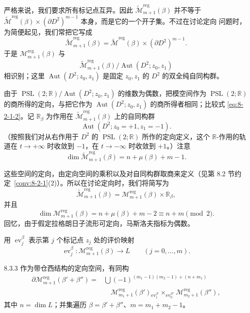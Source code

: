 严格来说，我们要求所有标记点互异。因此
$\widetilde{\mathcal M}_{m+1}^{\mathrm{reg}}(\beta)$ 并不等于
$\widetilde{\mathcal M}^{\mathrm{reg}}(\beta)
\times(\partial D^2)^{m-1}$ 本身，而是它的一个开子集。不过在讨论定向
问题时，为简便起见，我们常把它写成
\[
 \widetilde{\mathcal M}_{m+1}^{\mathrm{reg}}(\beta)
 =\widetilde{\mathcal M}^{\mathrm{reg}}(\beta)
  \times(\partial D^2)^{m-1}.
\]
于是
$\mathcal M_{m+1}^{\mathrm{reg}}(\beta)$ 与
\[
 \widetilde{\mathcal M}_{m+1}^{\mathrm{reg}}(\beta)
 /\operatorname{Aut}(D^2;z_0,z_1)
\]
相识别；这里 $\operatorname{Aut}(D^2;z_0,z_1)$ 是固定 $z_0,z_1$ 的
$D^2$ 的双全纯自同构群。

由于
$\operatorname{PSL}(2;\mathbb R)/\operatorname{Aut}(D^2;z_0,z_1)$
的维数为偶数，把模空间作为
$\operatorname{PSL}(2;\mathbb R)$ 的商所得的定向，与把它作为
$\operatorname{Aut}(D^2;z_0,z_1)$ 的商所得者相同；比较式
\eqref{eq:8-2-1-2}。记 $\mathbb R_\beta$ 为作用在
$\widetilde{\mathcal M}_{m+1}^{\mathrm{reg}}(\beta)$ 上的自同构群
\[
 \operatorname{Aut}(D^2;z_0=+1,z_1=-1).
\]
（按照我们对从右作用于 $D^2$ 的
$\operatorname{PSL}(2;\mathbb R)$ 所作的定向定义，这个
$\mathbb R$-作用的轨道在 $t\to+\infty$ 时收敛到 $-1$，在
$t\to-\infty$ 时收敛到 $+1$。）注意
\[
 \dim\widetilde{\mathcal M}_{m+1}^{\mathrm{reg}}(\beta)
 =n+\mu(\beta)+m-1.
\]

这些空间的定向，由定向空间的乘积以及对自同构群取商来定义（见第
8.2 节约定~\ref{conv:8-2-1}(2)）。所以在讨论定向时，我们将简写为
\begin{equation}
 \widetilde{\mathcal M}_{m+1}^{\mathrm{reg}}(\beta)
 =\mathcal M_{m+1}^{\mathrm{reg}}(\beta)\times\mathbb R_\beta,
 \tag{8.3.2}\label{eq:8-3-2}
\end{equation}
并且
\[
 \dim\mathcal M_{m+1}^{\mathrm{reg}}(\beta)
 =n+\mu(\beta)+m-2\equiv n+m\pmod2.
\]
回忆，由于假定拉格朗日子流形可定向，马斯洛夫指标为偶数。

用 $\operatorname{ev}_j^\beta$ 表示第 $j$ 个标记点 $z_j$ 处的评价映射
\[
 \operatorname{ev}_j^\beta\colon
 \mathcal M_{m+1}^{\mathrm{reg}}(\beta)\longrightarrow L
 \qquad(j=0,\ldots,m).
\]

\begin{proposition}{8.3.3}\label{prop:8-3-3}
作为带仓西结构的定向空间，有同构
\[
\begin{aligned}
 \partial\mathcal M_{m+1}^{\mathrm{reg}}(\beta'+\beta'')
 ={}&\bigcup
 (-1)^{(m_1-1)(m_2-1)+(n+m_1)}\\
 &\quad\mathcal M_{m_1+1}^{\mathrm{reg}}(\beta')
 {}_{\operatorname{ev}_1^{\beta'}}\!\times_{\operatorname{ev}_0^{\beta''}}
 \mathcal M_{m_2+1}^{\mathrm{reg}}(\beta''),
\end{aligned}
\]
其中 $n=\dim L$；并集遍历
$\beta=\beta'+\beta''$、$m=m_1+m_2-1$。
\end{proposition}

